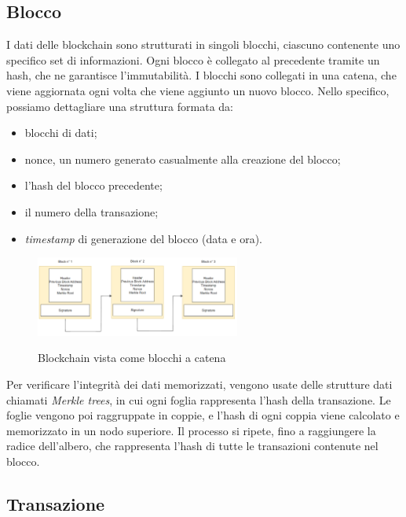 \subsection{Blocco}\label{sec:tecnologie-blockchain-blocco}

I dati delle blockchain sono strutturati in singoli blocchi, ciascuno contenente uno specifico set di informazioni.
Ogni blocco è collegato al precedente tramite un hash, che ne garantisce l'immutabilità.
I blocchi sono collegati in una catena, che viene aggiornata ogni volta che viene aggiunto un nuovo blocco.
Nello specifico, possiamo dettagliare una struttura formata da:
\begin{itemize}
    \item blocchi di dati;
    \item nonce, un numero generato casualmente alla creazione del blocco;
    \item l'hash del blocco precedente;
    \item il numero della transazione;
    \item \textit{timestamp} di generazione del blocco (data e ora).
\end{itemize} 

\begin{figure}[h]
    \centering
    \includegraphics[width=0.6\textwidth, alt={Blocco all'interno di una blockchain}]{immagini/blocco.png}
    \caption{Blockchain vista come blocchi a catena}
\end{figure}

Per verificare l'integrità dei dati memorizzati, vengono usate delle strutture dati chiamati \textit{Merkle trees}, in cui ogni foglia rappresenta l'hash della transazione.
Le foglie vengono poi raggruppate in coppie, e l'hash di ogni coppia viene calcolato e memorizzato in un nodo superiore.
Il processo si ripete, fino a raggiungere la radice dell'albero, che rappresenta l'hash di tutte le transazioni contenute nel blocco.

\subsection{Transazione}\label{sec:tecnologie-blockchain-transazione}

